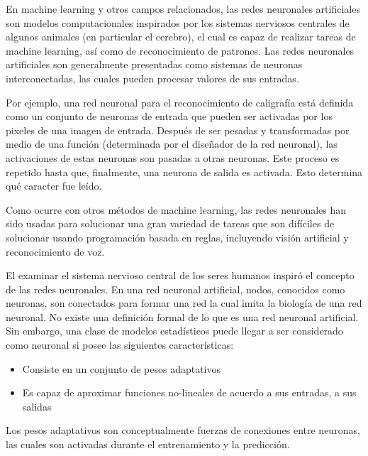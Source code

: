 En machine learning y otros campos relacionados, las redes neuronales
artificiales son modelos computacionales inspirados por los sistemas
nerviosos centrales de algunos animales (en particular el cerebro), el
cual es capaz de realizar tareas de machine learning, así como de
reconocimiento de patrones. Las redes neuronales artificiales son
generalmente presentadas como sistemas de neuronas interconectadas,
las cuales pueden procesar valores de sus entradas.

Por ejemplo, una red neuronal para el reconocimiento de caligrafía
está definida como un conjunto de neuronas de entrada que pueden ser
activadas por los pixeles de una imagen de entrada. Después de ser
pesadas y transformadas por medio de una función (determinada por el
diseñador de la red neuronal), las activaciones de estas neuronas son
pasadas a otras neuronas. Este proceso es repetido hasta que,
finalmente, una neurona de salida es activada. Esto determina qué
caracter fue leído.

Como ocurre con otros métodos de machine learning, las redes
neuronales han sido usadas para solucionar una gran variedad de tareas
que son difíciles de solucionar usando programación basada en reglas,
incluyendo visión artificial y reconocimiento de voz.

El examinar el sistema nervioso central de los seres humanos inspiró
el concepto de las redes neuronales. En una red neuronal artificial,
nodos, conocidos como neuronas, son conectados para formar una red la
cual imita la biología de una red neuronal. No existe una definición
formal de lo que es una red neuronal artificial. Sin embargo, una
clase de modelos estadísticos puede llegar a ser considerado como
neuronal si posee las siguientes características:

\begin{itemize}
  \item Consiste en un conjunto de pesos adaptativos
  \item Es capaz de aproximar funciones no-lineales de acuerdo a sus
    entradas, a sus salidas
\end{itemize}

Los pesos adaptativos son conceptualmente fuerzas de conexiones entre
neuronas, las cuales son activadas durante el entrenamiento y la
predicción.
